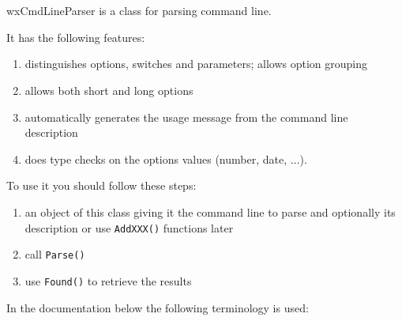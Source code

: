 
\section{}\label{wxcmdlineparser}

wxCmdLineParser is a class for parsing command line.

It has the following features:

\begin{enumerate}\itemsep=0pt
\item distinguishes options, switches and parameters; allows option grouping
\item allows both short and long options
\item automatically generates the usage message from the command line description
\item does type checks on the options values (number, date, $\ldots$).
\end{enumerate}

To use it you should follow these steps:

\begin{enumerate}\itemsep=0pt
\item {} an object of this class
giving it the command line to parse and optionally its description or use 
{\tt AddXXX()} functions later
\item call {\tt Parse()}
\item use {\tt Found()} to retrieve the results
\end{enumerate}

In the documentation below the following terminology is used:

\begin{twocollist}\itemsep=0pt
\end{twocollist}

